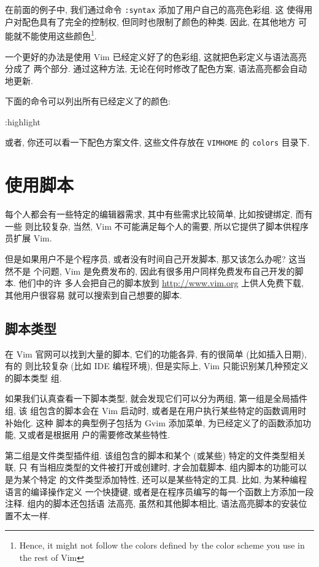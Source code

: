 在前面的例子中, 我们通过命令 \texttt{:syntax} 添加了用户自己的高亮色彩组. 这
使得用户对配色具有了完全的控制权, 但同时也限制了颜色的种类. 因此, 在其他地方
可能就不能使用这些颜色\footnote{Hence, it might not follow the colors defined
by the color scheme you use in the rest of Vim}.

一个更好的办法是使用 Vim 已经定义好了的色彩组, 这就把色彩定义与语法高亮分成了
两个部分. 通过这种方法, 无论在何时修改了配色方案, 语法高亮都会自动地更新.

下面的命令可以列出所有已经定义了的颜色:
\begin{vimcode}
:highlight
\end{vimcode}

\begin{warning}
    或者, 你还可以看一下配色方案文件, 这些文件存放在 \texttt{VIMHOME} 的
    \texttt{colors} 目录下.
\end{warning}

\section{使用脚本}
\label{sec:using_scripts}

每个人都会有一些特定的编辑器需求, 其中有些需求比较简单, 比如按键绑定, 而有一些
则比较复杂, 当然, Vim 不可能满足每个人的需要, 所以它提供了脚本供程序员扩展
Vim.

但是如果用户不是个程序员, 或者没有时间自己开发脚本, 那又该怎么办呢? 这当然不是
个问题, Vim 是免费发布的, 因此有很多用户同样免费发布自己开发的脚本. 他们中的许
多人会把自己的脚本放到 \url{http://www.vim.org} 上供人免费下载, 其他用户很容易
就可以搜索到自己想要的脚本.

\subsection{脚本类型}
\label{subsec:script_types}

在 Vim 官网可以找到大量的脚本, 它们的功能各异, 有的很简单 (比如插入日期), 有的
则比较复杂 (比如 IDE 编程环境), 但是实际上, Vim 只能识别某几种预定义的脚本类型
组.

如果我们认真查看一下脚本类型, 就会发现它们可以分为两组, 第一组是全局插件组, 该
组包含的脚本会在 Vim 启动时, 或者是在用户执行某些特定的函数调用时补始化. 这种
脚本的典型例子包括为 Gvim 添加菜单, 为已经定义了的函数添加功能, 又或者是根据用
户的需要修改某些特性.

第二组是文件类型插件组. 该组包含的脚本和某个 (或某些) 特定的文件类型相关联, 只
有当相应类型的文件被打开或创建时, 才会加载脚本. 组内脚本的功能可以是为某个特定
的文件类型添加特性, 还可以是某些特定的工具. 比如, 为某种编程语言的编译操作定义
一个快捷键, 或者是在程序员编写的每一个函数上方添加一段注释. 组内的脚本还包括语
法高亮, 虽然和其他脚本相比, 语法高亮脚本的安装位置不太一样.

